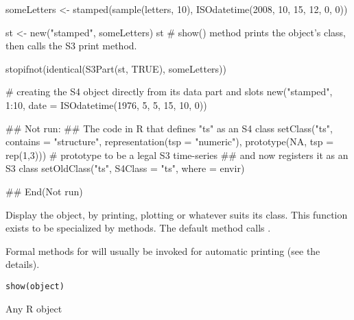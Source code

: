 \begin{Examples}
\begin{ExampleCode}
someLetters <- stamped(sample(letters, 10),
                       ISOdatetime(2008, 10, 15, 12, 0, 0))

st <- new("stamped", someLetters)
st
# show() method prints the object's class, then calls the S3 print method.

stopifnot(identical(S3Part(st, TRUE), someLetters))

# creating the S4 object directly from its data part and slots
new("stamped", 1:10, date = ISOdatetime(1976, 5, 5, 15, 10, 0))

## Not run: 
## The code in R that defines "ts" as an S4 class
setClass("ts", contains = "structure",
      representation(tsp = "numeric"),
      prototype(NA, tsp = rep(1,3)))
# prototype to be a legal S3 time-series
## and now registers it as an S3 class
    setOldClass("ts", S4Class = "ts", where = envir)

## End(Not run)



\end{ExampleCode}
\end{Examples}
%
\begin{Description}\relax
Display the object, by printing, plotting or whatever suits its
class.  This function exists to be specialized by methods.  The
default method calls .

Formal methods for  will
usually be invoked for automatic printing (see the details).
\end{Description}
%
\begin{Usage}
\begin{verbatim}
show(object)
\end{verbatim}
\end{Usage}
%
\begin{Arguments}
\begin{ldescription}
\item[\code{object}] Any R object
\end{ldescription}
\end{Arguments}
